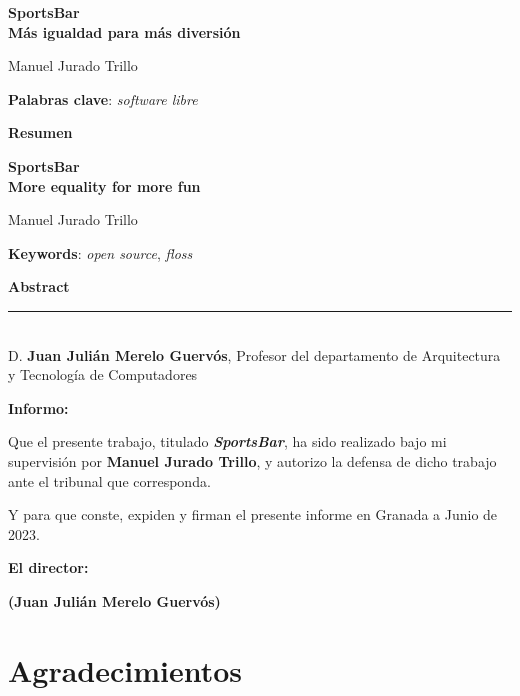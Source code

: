 \thispagestyle{empty}

\begin{center}
{\large\bfseries SportsBar \\ Más igualdad para más diversión }\\
\end{center}
\begin{center}
Manuel Jurado Trillo\\
\end{center}


\vspace{0.5cm}
\noindent\textbf{Palabras clave}: \textit{software libre}
\vspace{0.7cm}

\noindent\textbf{Resumen}\\
	

\cleardoublepage

\begin{center}
	{\large\bfseries SportsBar \\ More equality for more fun}\\
\end{center}
\begin{center}
	Manuel Jurado Trillo\\
\end{center}
\vspace{0.5cm}
\noindent\textbf{Keywords}: \textit{open source}, \textit{floss}
\vspace{0.7cm}

\noindent\textbf{Abstract}\\


\cleardoublepage

\thispagestyle{empty}

\noindent\rule[-1ex]{\textwidth}{2pt}\\[4.5ex]

D. \textbf{Juan Julián Merelo Guervós}, Profesor del departamento de Arquitectura y Tecnología de Computadores

\vspace{0.5cm}

\textbf{Informo:}

\vspace{0.5cm}

Que el presente trabajo, titulado \textit{\textbf{SportsBar}},
ha sido realizado bajo mi supervisión por \textbf{Manuel Jurado Trillo}, y autorizo la defensa de dicho trabajo ante el tribunal
que corresponda.

\vspace{0.5cm}

Y para que conste, expiden y firman el presente informe en Granada a Junio de 2023.

\vspace{1cm}

\textbf{El director: }

\vspace{5cm}

\noindent \textbf{(Juan Julián Merelo Guervós)}

\chapter*{Agradecimientos}




